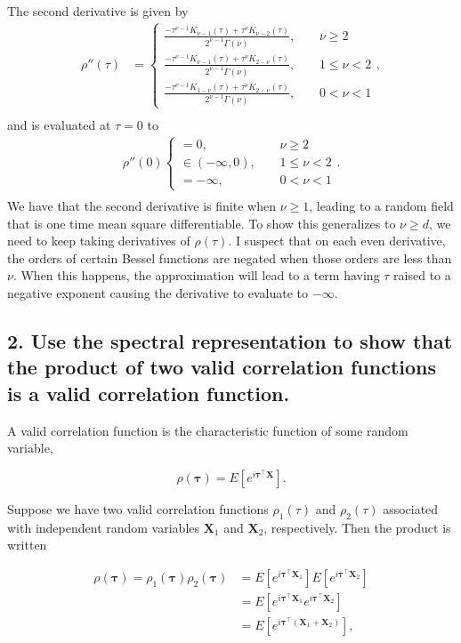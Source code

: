 \documentclass[12pt]{article}
\newcommand{\m}[1]{\mathbf{\bm{#1}}}
\begin{document}
The second derivative is given by
\begin{align*}
\rho''(\tau) &= \begin{cases} \frac{-\tau^{\nu-1} K_{\nu-1}(\tau)+\tau^\nu K_{\nu-2}(\tau)}{2^{\nu-1}\Gamma(\nu)},~~~~~ &\nu\geq2 \\
  \frac{-\tau^{\nu-1} K_{\nu-1}(\tau)+\tau^\nu K_{2-\nu}(\tau)}{2^{\nu-1}\Gamma(\nu)},~~~~~ &1\leq\nu<2 \\
  \frac{-\tau^{\nu-1} K_{1-\nu}(\tau)+\tau^\nu K_{2-\nu}(\tau)}{2^{\nu-1}\Gamma(\nu)},~~~~~ &0<\nu<1 
\end{cases}, \\
\end{align*}
and is evaluated at $\tau=0$ to
\begin{align*}
\rho''(0) \begin{cases} =0,~~~~~ &\nu\geq2 \\
  \in(-\infty,0),~~~~~ &1\leq\nu<2 \\
  =-\infty,~~~~~ &0<\nu<1 
\end{cases}. \\
\end{align*}
We have that the second derivative is finite when $\nu\geq 1$, leading to a random field that is one time mean square differentiable. To show this generalizes to $\nu\geq d$, we need to keep taking derivatives of $\rho(\tau)$. I suspect that on each even derivative, the orders of certain Bessel functions are negated when those orders are less than $\nu$. When this happens, the approximation will lead to a term having $\tau$ raised to a negative exponent causing the derivative to evaluate to $-\infty$.


\subsection*{2. Use the spectral representation to show that the product of two valid correlation functions is a valid correlation function.}

A valid correlation function is the characteristic function of some random variable,

\[ \rho(\m{\tau}) = E\left[e^{i\m{\tau}^\top\m{X}}\right]. \]

Suppose we have two valid correlation functions $\rho_1(\tau)$ and $\rho_2(\tau)$ associated with independent random variables $\m{X}_1$ and $\m{X}_2$, respectively. Then the product is written

\begin{align*}
\rho(\m{\tau}) = \rho_1(\m{\tau})\rho_2(\m{\tau}) &= E\left[e^{i\m{\tau}^\top\m{X}_1}\right]E\left[e^{i\m{\tau}^\top\m{X}_2}\right] \\
 &= E\left[e^{i\m{\tau}^\top\m{X}_1}e^{i\m{\tau}^\top\m{X}_2}\right] \\
 &= E\left[e^{i\m{\tau}^\top(\m{X}_1+\m{X}_2)}\right], 
\end{align*}
\end{document}
